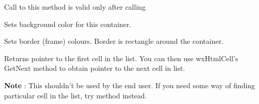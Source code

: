 Call to this method is valid only after calling 

\label{wxhtmlcontainercellsetbackgroundcolour}


Sets background color for this container.

\label{wxhtmlcontainercellsetborder}


Sets border (frame) colours. Border is rectangle around the container.




\label{wxhtmlcontainercellgetfirstcell}


Returns pointer to the first cell in the list.
You can then use wxHtmlCell's GetNext method to obtain pointer to the next
cell in list.

{\bf Note} : This shouldn't be used by the end user. If you need some way of
finding particular cell in the list, try  method
instead.

